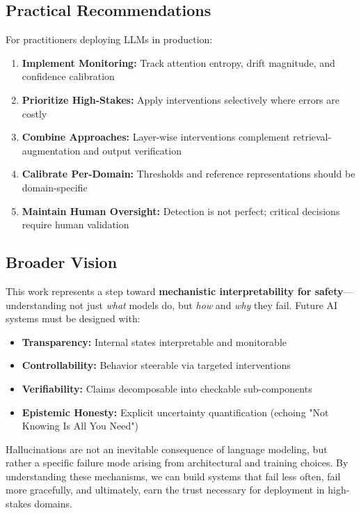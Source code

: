 \documentclass[11pt]{article}
\begin{document}
\subsection{Practical Recommendations}

For practitioners deploying LLMs in production:

\begin{enumerate}
    \item \textbf{Implement Monitoring:} Track attention entropy, drift magnitude, and confidence calibration
    \item \textbf{Prioritize High-Stakes:} Apply interventions selectively where errors are costly
    \item \textbf{Combine Approaches:} Layer-wise interventions complement retrieval-augmentation and output verification
    \item \textbf{Calibrate Per-Domain:} Thresholds and reference representations should be domain-specific
    \item \textbf{Maintain Human Oversight:} Detection is not perfect; critical decisions require human validation
\end{enumerate}

\subsection{Broader Vision}

This work represents a step toward \textbf{mechanistic interpretability for safety}---understanding not just \textit{what} models do, but \textit{how} and \textit{why} they fail. Future AI systems must be designed with:

\begin{itemize}
    \item \textbf{Transparency:} Internal states interpretable and monitorable
    \item \textbf{Controllability:} Behavior steerable via targeted interventions
    \item \textbf{Verifiability:} Claims decomposable into checkable sub-components
    \item \textbf{Epistemic Honesty:} Explicit uncertainty quantification (echoing "Not Knowing Is All You Need")
\end{itemize}

Hallucinations are not an inevitable consequence of language modeling, but rather a specific failure mode arising from architectural and training choices. By understanding these mechanisms, we can build systems that fail less often, fail more gracefully, and ultimately, earn the trust necessary for deployment in high-stakes domains.
\end{document}
